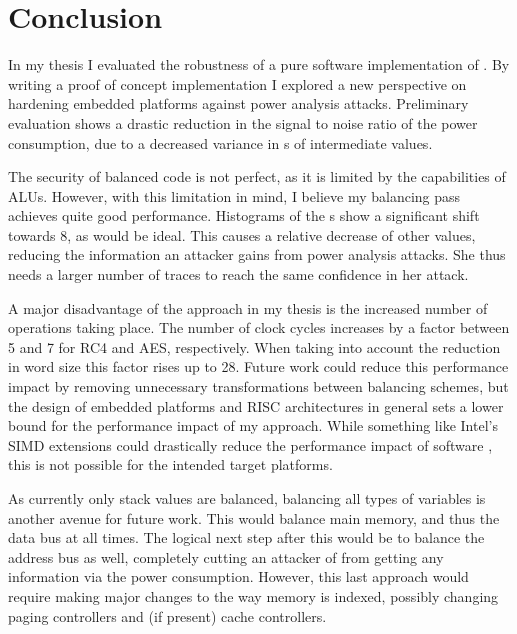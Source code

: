 \section{Conclusion}
\label{conclusion}
In my thesis I evaluated the robustness of a pure software implementation of \dual{}.
By writing a proof of concept implementation I explored a new perspective on hardening embedded platforms against power analysis attacks.
Preliminary evaluation shows a drastic reduction in the signal to noise ratio of the power consumption, due to a decreased variance in \hammingw{}s of intermediate values.

The security of balanced code is not perfect, as it is limited by the capabilities of ALUs.
However, with this limitation in mind, I believe my balancing pass achieves quite good performance.
Histograms of the \hammingw{}s show a significant shift towards 8, as would be ideal.
This causes a relative decrease of other values, reducing the information an attacker gains from power analysis attacks.
She thus needs a larger number of traces to reach the same confidence in her attack.

A major disadvantage of the approach in my thesis is the increased number of operations taking place.
The number of clock cycles increases by a factor between 5 and 7 for RC4 and AES, respectively.
When taking into account the reduction in word size this factor rises up to 28.
Future work could reduce this performance impact by removing unnecessary transformations between balancing schemes, but the design of embedded platforms and RISC architectures in general sets a lower bound for the performance impact of my approach.
While something like Intel's SIMD extensions\cite{lomont2011introduction} could drastically reduce the performance impact of software \dual{}, this is not possible for the intended target platforms.

As currently only stack values are balanced, balancing all types of variables is another avenue for future work.
This would balance main memory, and thus the data bus at all times.
The logical next step after this would be to balance the address bus as well, completely cutting an attacker of from getting any information via the power consumption.
However, this last approach would require making major changes to the way memory is indexed, possibly changing paging controllers and (if present) cache controllers.

